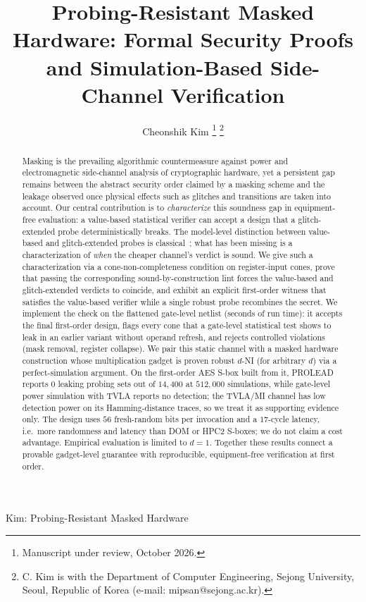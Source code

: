 \documentclass[lettersize,journal]{IEEEtran}
\begin{document}
\title{Probing-Resistant Masked Hardware: Formal Security Proofs and Simulation-Based Side-Channel Verification}

\author{Cheonshik Kim
\thanks{Manuscript under review, October 2026.}
\thanks{C. Kim is with the Department of Computer Engineering, Sejong University,
Seoul, Republic of Korea (e-mail: mipsan@sejong.ac.kr).}
}

%
{Kim: Probing-Resistant Masked Hardware}

\maketitle

\begin{abstract}
Masking is the prevailing algorithmic countermeasure against power and
electromagnetic side-channel analysis of cryptographic hardware, yet a
persistent gap remains between the abstract security order claimed by a
masking scheme and the leakage observed once physical effects such as
glitches and transitions are taken into account.
Our central contribution is to \emph{characterize} this
soundness gap in equipment-free evaluation: a value-based statistical
verifier can accept a design that a glitch-extended probe deterministically
breaks. The model-level distinction between value-based and
glitch-extended probes is classical~\cite{faust2018composable};
what has been missing is a characterization of \emph{when}
the cheaper channel's verdict is sound. We give such a
characterization via a cone-non-completeness condition on
register-input cones, prove that passing the corresponding
sound-by-construction lint forces the value-based and glitch-extended
verdicts to coincide, and exhibit an explicit first-order
witness that satisfies the value-based verifier while a
single robust probe recombines the secret. We implement the check on the
flattened gate-level netlist (seconds of run time): it accepts the final
first-order design, flags every cone that a gate-level statistical test shows
to leak in an earlier variant without operand refresh, and rejects controlled
violations (mask removal, register collapse).
We pair this static channel with a masked hardware construction whose
multiplication gadget is proven robust $d$-NI (for arbitrary $d$) via a
perfect-simulation argument. On the first-order AES S-box built from it,
PROLEAD reports $0$ leaking probing sets out of $14{,}400$ at $512{,}000$
simulations, while gate-level power simulation with TVLA reports no
detection; the TVLA/MI channel has low detection power on its
Hamming-distance traces, so we treat it as supporting evidence only. The
design uses $56$ fresh-random bits per invocation and a $17$-cycle
latency, i.e.\ more randomness and latency than DOM or HPC2 S-boxes; we do
not claim a cost advantage. Empirical evaluation is limited to $d{=}1$.
Together these results connect a provable gadget-level guarantee with
reproducible, equipment-free verification at first order.
\end{abstract}
\end{document}
